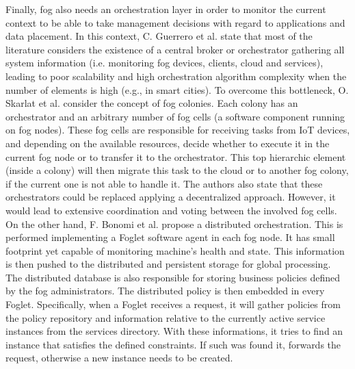 \noindent\tab Finally, fog also needs an orchestration layer in order to monitor the current context to be able to take management decisions with regard to applications and data placement. In this context, C. Guerrero et al. \cite{guerrero2018influence} state that most of the literature considers the existence of a central broker or orchestrator gathering all system information (i.e. monitoring fog devices, clients, cloud and services), leading to poor scalability and high orchestration algorithm complexity when the number of elements is high (e.g., in smart cities). To overcome this bottleneck, O. Skarlat et al. \cite{skarlat2016resource,skarlat2017optimized} consider the concept of fog colonies. Each colony has an orchestrator and an arbitrary number of fog cells (a software component running on fog nodes). These fog cells are responsible for receiving tasks from IoT devices, and depending on the available resources, decide whether to execute it in the current fog node or to transfer it to the orchestrator. This top hierarchic element (inside a colony) will then migrate this task to the cloud or to another fog colony, if the current one is not able to handle it. The authors also state that these orchestrators could be replaced applying a decentralized approach. However, it would lead to extensive coordination and voting between the involved fog cells. On the other hand, F. Bonomi et al. \cite{bonomi2014fog} propose a distributed orchestration. This is performed implementing a Foglet software agent in each fog node. It has small footprint yet capable of monitoring machine's health and state. This information is then pushed to the distributed and persistent storage for global processing. The distributed database is also responsible for storing business policies defined by the fog administrators. The distributed policy is then embedded in every Foglet. Specifically, when a Foglet receives a request, it will gather policies from the policy repository and information relative to the currently active service instances from the services directory. With these informations, it tries to find an instance that satisfies the defined constraints. If such was found it, forwards the request, otherwise a new instance needs to be created.\\
